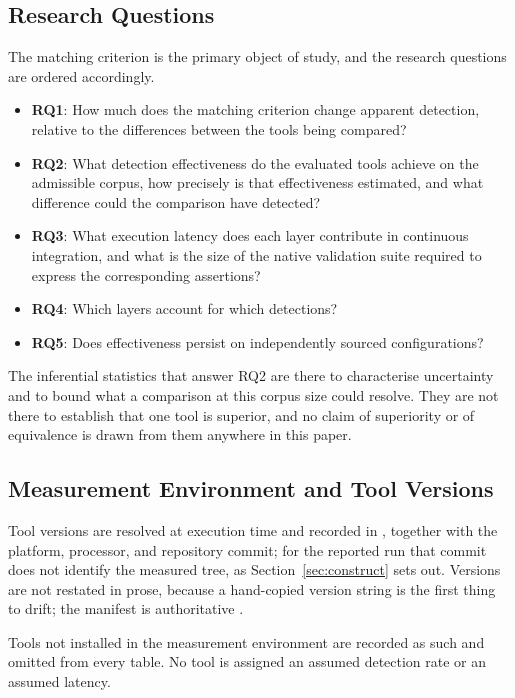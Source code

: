 \documentclass[smallextended]{svjour3}
\begin{document}
\subsection{Research Questions}
The matching criterion is the primary object of study, and the research questions
are ordered accordingly.
\begin{itemize}
\item \textbf{RQ1}: How much does the matching criterion change apparent
detection, relative to the differences between the tools being compared?
\item \textbf{RQ2}: What detection effectiveness do the evaluated tools achieve
on the admissible corpus, how precisely is that effectiveness estimated, and what
difference could the comparison have detected?
\item \textbf{RQ3}: What execution latency does each layer contribute in
continuous integration, and what is the size of the native validation suite
required to express the corresponding assertions?
\item \textbf{RQ4}: Which layers account for which detections?
\item \textbf{RQ5}: Does effectiveness persist on independently sourced
configurations?
\end{itemize}

The inferential statistics that answer RQ2 are there to characterise uncertainty
and to bound what a comparison at this corpus size could resolve. They are not
there to establish that one tool is superior, and no claim of superiority or of
equivalence is drawn from them anywhere in this paper.

\subsection{Measurement Environment and Tool Versions}
\label{sec:environment}
Tool versions are resolved at execution time and recorded in
, together with the platform, processor, and
repository commit; for the reported run that commit does not identify the
measured tree, as Section~\ref{sec:construct} sets out. Versions are not restated in prose, because a hand-copied
version string is the first thing to drift; the manifest is authoritative
\citep{bohme2022reliability}.

Tools not installed in the measurement environment are recorded as such and
omitted from every table. No tool is assigned an assumed detection rate or an
assumed latency.
\end{document}
